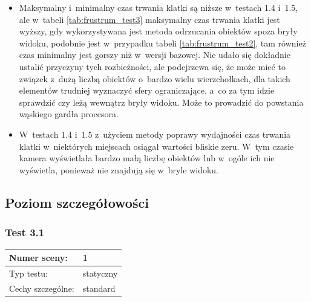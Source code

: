 \documentclass[a4paper,twoside,12pt]{book}
\begin{document}
\begin{itemize}
    \item Maksymalny i~minimalny czas trwania klatki są niższe w~testach 1.4 i~1.5, ale w~tabeli \ref{tab:frustrum_test3} maksymalny czas trwania klatki jest wyższy, gdy wykorzystywana jest metoda odrzucania obiektów spoza bryły widoku, podobnie jest w~przypadku tabeli \ref{tab:frustrum_test2}, tam również czas minimalny jest gorszy niż w~wersji bazowej. Nie udało się dokładnie ustalić przyczyny tych rozbieżności, ale podejrzewa się, że może mieć to związek z~dużą liczbą obiektów o~bardzo wielu wierzchołkach, dla takich elementów trudniej wyznaczyć sfery ograniczające, a~co za tym idzie sprawdzić czy leżą wewnątrz bryły widoku. Może to prowadzić do powstania wąskiego gardła procesora.
    \item W~testach 1.4 i~1.5 z~użyciem metody poprawy wydajności czas trwania klatki w~niektórych miejscach osiągał wartości bliskie zeru. W~tym czasie kamera wyświetlała bardzo małą liczbę obiektów lub w~ogóle ich nie wyświetla, ponieważ nie znajdują się w~bryle widoku.
\end{itemize}



\subsection{Poziom szczegółowości}
\subsubsection{Test 3.1}
\begin{tabular}{|l||l|}
\hline
Numer sceny: & 1 \\
\hline
Typ testu: & statyczny \\
\hline
Cechy szczególne: & standard \\
\hline
\end{tabular}\\

\vbox{}
\end{document}
